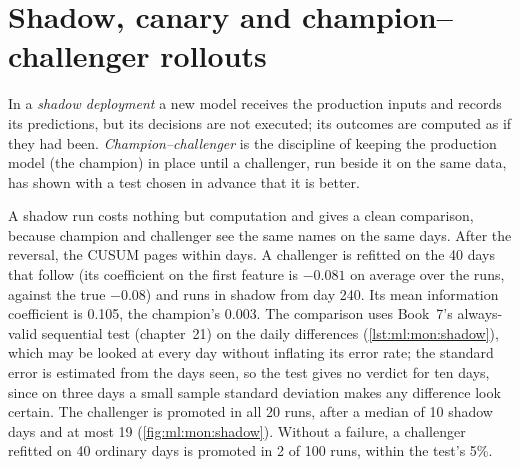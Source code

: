 \section{Shadow, canary and champion--challenger rollouts}

\begin{definition}\label{def:ml:monitoring-and-retraining:shadow}
In a \emph{shadow deployment} a new model receives the production inputs and records its predictions,
but its decisions are not executed; its outcomes are computed as if they had been. \emph{Champion--challenger}
is the discipline of keeping the production model (the champion) in place until a challenger, run beside it on the same data,
has shown with a test chosen in advance that it is better.
\end{definition}

A shadow run costs nothing but computation and gives a clean comparison, because champion and challenger see the same names on
the same days. After the reversal, the CUSUM pages within days. A challenger is refitted on the 40 days that
follow (its coefficient on the first feature is $-0.081$ on average over the runs, against the true $-0.08$) and runs in shadow
from day 240. Its mean information coefficient is 0.105, the champion's 0.003. The comparison uses Book~7's always-valid
sequential test (chapter~21) on the daily differences (\cref{lst:ml:mon:shadow}), which may be looked at every day without
inflating its error rate; the standard error is estimated from the days seen, so the test gives no verdict for ten days, since on
three days a small sample standard deviation makes any difference look certain. The challenger is promoted in all 20 runs, after
a median of 10 shadow days and at most 19 (\cref{fig:ml:mon:shadow}). Without a failure, a challenger refitted on 40 ordinary
days is promoted in 2 of 100 runs, within the test's 5\%.

